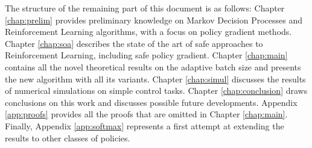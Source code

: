 The structure of the remaining part of this document is as follows: Chapter \ref{chap:prelim} provides preliminary knowledge on Markov Decision Processes and Reinforcement Learning algorithms, with a focus on policy gradient methods. Chapter \ref{chap:soa} describes the state of the art of safe approaches to Reinforcement Learning, including safe policy gradient. Chapter \ref{chap:main} contains all the novel theoretical results on the adaptive batch size and presents the new algorithm with all its variants. Chapter \ref{chap:simul} discusses the results of numerical simulations on simple control tasks. Chapter \ref{chap:conclusion} draws conclusions on this work and discusses possible future developments.
Appendix \ref{app:proofs} provides all the proofs that are omitted in Chapter \ref{chap:main}. Finally, Appendix \ref{app:softmax} represents a first attempt at extending the results to other classes of policies.
